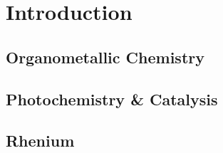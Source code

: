\chapter{Introduction}
\section{Organometallic Chemistry}

\section{Photochemistry \& Catalysis}

\section{Rhenium}
